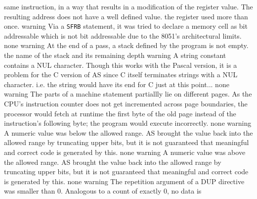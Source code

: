\documentclass[12pt,twoside]{report}
\newcommand{\tty}[1]{{\tt #1}}
\newcommand{\asname}{{AS}}
\begin{document}
\begin{description}
{                same instruction, in a way that results in a modification
                of the register value. The resulting address does not have a
                well defined value.}
               {the register used more than once.}
               {warning}
               {Via a \tty{SFRB} statement, it was tried to declare a memory cell
                as bit addressable which is not bit addressable due to the
                8051's architectural limits.}
               {none}
               {warning}
               {At the end of a pass, a stack defined by the program is
                not empty.}
               {the name of the stack and its remaining depth}
               {warning}
               {A string constant contains a NUL character. Though this
                works with the Pascal version, it is a problem for the
                C version of \asname{} since C itself terminates strings with
                a NUL character. i.e. the string would have its end for
                C just at this point...}
               {none}
               {warning}
               {The parts of a machine statement partiallly lie on
                different pages.  As the CPU's instruction counter does
                not get incremented across page boundaries, the processor
                would fetch at runtime the first byte of the old page
                instead of the instruction's following byte; the program
                would execute incorrectly.}
               {none}
               {warning}
               {A numeric value was below the allowed range.  \asname{} brought
                the value back into the allowed range by truncating upper
                bits, but it is not guaranteed that meaningful and correct
                code is generated by this.}
               {none}
               {warning}
               {A numeric value was above the allowed range.  \asname{} brought
                the value back into the allowed range by truncating upper
                bits, but it is not guaranteed that meaningful and correct
                code is generated by this.}
               {none}
               {warning}
               {The repetition argument of a DUP directive was smaller
                than 0.  Analogous to a count of exactly 0, no data is
}
\end{description}
\end{document}
